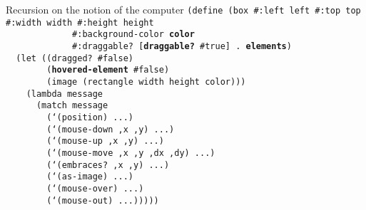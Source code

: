 \begin{frame}{Recursion on the notion of the computer}
  \tiny
  \texttt{(define (box \#:left left \#:top top \#:width width \#:height height\\
    \ \ \ \ \ \ \ \ \ \ \ \ \ \#:background-color \textbf{color}\\
    \ \ \ \ \ \ \ \ \ \ \ \ \ \#:draggable? [\textbf{draggable?} \#true] . \textbf{elements})\\
    \ \ (let ((dragged? \#false)\\
    \ \ \ \ \ \ \ \ (\textbf{hovered-element} \#false)\\
    \ \ \ \ \ \ \ \ (image (rectangle width height color)))\\
    \ \ \ \ (lambda message\\
    \ \ \ \ \ \ (match message\\
    \ \ \ \ \ \ \ \ (`(position) ...)\\
    \ \ \ \ \ \ \ \ (`(mouse-down ,x ,y) ...)\\
    \ \ \ \ \ \ \ \ (`(mouse-up ,x ,y) ...)\\
    \ \ \ \ \ \ \ \ (`(mouse-move ,x ,y ,dx ,dy) ...)\\
    \ \ \ \ \ \ \ \ (`(embraces? ,x ,y) ...)\\
    \ \ \ \ \ \ \ \ (`(as-image) ...)\\
    \ \ \ \ \ \ \ \ (`(mouse-over) ...)\\
    \ \ \ \ \ \ \ \ (`(mouse-out) ...)))))\\
    \ \\
    \ \\
    \ \\
    \ \\
    \ \\
    \ \\
    \ \\
    \ \\
    \ \\
    \ \\
    \ \\
    \ 
    }
\end{frame}

